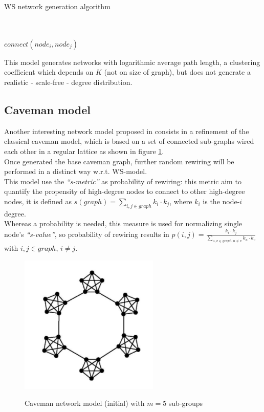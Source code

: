 \begin{algorithm}
\caption{WS network generation algorithm}
\label{sn_ws_alg}
\begin{algorithmic}
\STATE
{}\\
\\
	 		\STATE $connect(node_{i},node_{j})$
 		\ENDIF
 	\ENDFOR
\ENDFOR
\end{algorithmic}
\end{algorithm}

This model generates networks with logarithmic average path length, a clustering coefficient which depends on $K$ (not on size of graph), but does not generate a realistic - scale-free - degree distribution.

\subsection{Caveman model}
\label{sn_caveman_model}
Another interesting network model proposed in\cite{4149781} consists in a refinement of the classical caveman model, which is based on a set of connected sub-graphs wired each other in a regular lattice as shown in figure \ref{fig:caveman}.\\
 Once generated the base caveman graph, further random rewiring will be performed in a distinct way w.r.t. WS-model.\\
This model use the \emph{``s-metric''} as probability of rewiring: this metric aim to quantify the propensity of high-degree nodes to connect to other high-degree nodes, it is defined as $s(graph)=\sum_{i,j \in graph}{k_{i} \cdot k_{j}} $, where $k_{i}$ is the node-$i$ degree.\\
Whereas a probability is needed, this measure is used for normalizing single node's \emph{``s-value''}, so probability of rewiring results in $p(i,j) =\frac{k_{i} \cdot k_{j}}{\sum_{u,v \in graph, u \neq v}{k_{u} \cdot k_{v}}}$ with $i,j \in graph$, $i \neq j$.\\

\begin{figure}[h!]
	\begin{center}
    \label{fig:caveman}
    \includegraphics[scale=0.5]{img/caveman.png}
    \caption{Caveman network model (initial) with $m=5$ sub-groups}
  \end{center}
\end{figure}

